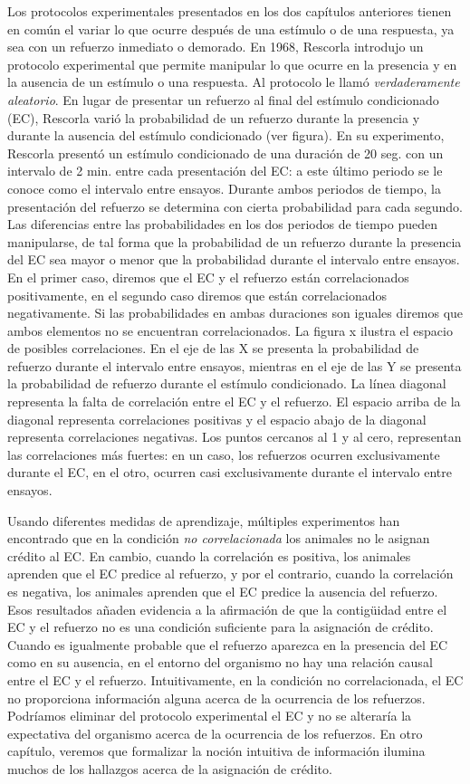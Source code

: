 \documentclass[
  a4paper,
  DIV=11,
  numbers=noendperiod]{scrreprt}
\begin{document}
Los protocolos experimentales presentados en los dos capítulos
anteriores tienen en común el variar lo que ocurre después de una
estímulo o de una respuesta, ya sea con un refuerzo inmediato o
demorado. En 1968, Rescorla introdujo un protocolo experimental que
permite manipular lo que ocurre en la presencia y en la ausencia de un
estímulo o una respuesta. Al protocolo le llamó \emph{verdaderamente
aleatorio}. En lugar de presentar un refuerzo al final del estímulo
condicionado (EC), Rescorla varió la probabilidad de un refuerzo durante
la presencia y durante la ausencia del estímulo condicionado (ver
figura). En su experimento, Rescorla presentó un estímulo condicionado
de una duración de 20 seg. con un intervalo de 2 min. entre cada
presentación del EC: a este último periodo se le conoce como el
intervalo entre ensayos. Durante ambos periodos de tiempo, la
presentación del refuerzo se determina con cierta probabilidad para cada
segundo. Las diferencias entre las probabilidades en los dos periodos de
tiempo pueden manipularse, de tal forma que la probabilidad de un
refuerzo durante la presencia del EC sea mayor o menor que la
probabilidad durante el intervalo entre ensayos. En el primer caso,
diremos que el EC y el refuerzo están correlacionados positivamente, en
el segundo caso diremos que están correlacionados negativamente. Si las
probabilidades en ambas duraciones son iguales diremos que ambos
elementos no se encuentran correlacionados. La figura x ilustra el
espacio de posibles correlaciones. En el eje de las X se presenta la
probabilidad de refuerzo durante el intervalo entre ensayos, mientras en
el eje de las Y se presenta la probabilidad de refuerzo durante el
estímulo condicionado. La línea diagonal representa la falta de
correlación entre el EC y el refuerzo. El espacio arriba de la diagonal
representa correlaciones positivas y el espacio abajo de la diagonal
representa correlaciones negativas. Los puntos cercanos al 1 y al cero,
representan las correlaciones más fuertes: en un caso, los refuerzos
ocurren exclusivamente durante el EC, en el otro, ocurren casi
exclusivamente durante el intervalo entre ensayos.

Usando diferentes medidas de aprendizaje, múltiples experimentos han
encontrado que en la condición \emph{no correlacionada} los animales no
le asignan crédito al EC. En cambio, cuando la correlación es positiva,
los animales aprenden que el EC predice al refuerzo, y por el contrario,
cuando la correlación es negativa, los animales aprenden que el EC
predice la ausencia del refuerzo. Esos resultados añaden evidencia a la
afirmación de que la contigüidad entre el EC y el refuerzo no es una
condición suficiente para la asignación de crédito. Cuando es igualmente
probable que el refuerzo aparezca en la presencia del EC como en su
ausencia, en el entorno del organismo no hay una relación causal entre
el EC y el refuerzo. Intuitivamente, en la condición no correlacionada,
el EC no proporciona información alguna acerca de la ocurrencia de los
refuerzos. Podríamos eliminar del protocolo experimental el EC y no se
alteraría la expectativa del organismo acerca de la ocurrencia de los
refuerzos. En otro capítulo, veremos que formalizar la noción intuitiva
de información ilumina muchos de los hallazgos acerca de la asignación
de crédito.
\end{document}
